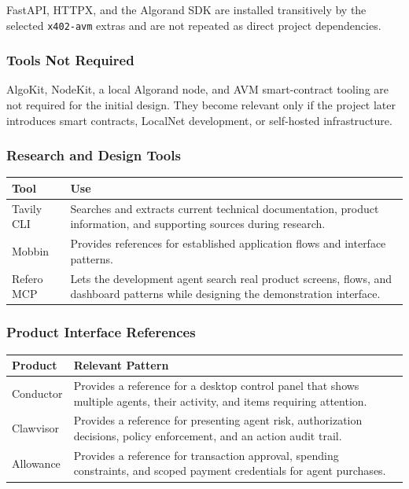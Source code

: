 \documentclass[11pt]{article}
\begin{document}
FastAPI, HTTPX, and the Algorand SDK are installed transitively by the selected
\texttt{x402-avm} extras and are not repeated as direct project dependencies.

\subsubsection{Tools Not Required}

AlgoKit, NodeKit, a local Algorand node, and AVM smart-contract tooling are not
required for the initial design. They become relevant only if the project later
introduces smart contracts, LocalNet development, or self-hosted infrastructure.

\subsubsection{Research and Design Tools}

\begin{tabularx}{\textwidth}{@{}lX@{}}
\toprule
\textbf{Tool} & \textbf{Use} \\
\midrule
Tavily CLI &
Searches and extracts current technical documentation, product information, and
supporting sources during research. \\
Mobbin &
Provides references for established application flows and interface patterns. \\
Refero MCP &
Lets the development agent search real product screens, flows, and dashboard
patterns while designing the demonstration interface. \\
\bottomrule
\end{tabularx}

\subsubsection{Product Interface References}

\begin{tabularx}{\textwidth}{@{}lX@{}}
\toprule
\textbf{Product} & \textbf{Relevant Pattern} \\
\midrule
Conductor &
Provides a reference for a desktop control panel that shows multiple agents,
their activity, and items requiring attention. \\
Clawvisor &
Provides a reference for presenting agent risk, authorization decisions,
policy enforcement, and an action audit trail. \\
Allowance &
Provides a reference for transaction approval, spending constraints, and
scoped payment credentials for agent purchases. \\
\bottomrule
\end{tabularx}
\end{document}

